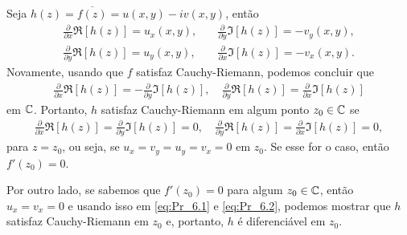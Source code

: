\begin{questions}
\begin{solution}
    Seja $h(z) = \overline{f(z)} = u(x,y) - iv(x,y)$, então
    \begin{align}
        \frac{\partial}{\partial x} \Re[h(z)] = u_x(x,y), &\quad
        \frac{\partial}{\partial y} \Im[h(z)] = -v_y(x,y), \label{eq:Pr_6.1}\\
        \frac{\partial}{\partial y} \Re[h(z)] = u_y(x,y), &\quad
        \frac{\partial}{\partial x} \Im[h(z)] = -v_x(x,y). \label{eq:Pr_6.2}
    \end{align}
    Novamente, usando que $f$ satisfaz Cauchy-Riemann, podemos concluir que
    \begin{align*}
        \frac{\partial}{\partial x} \Re[h(z)] = -\frac{\partial}{\partial y} \Im[h(z)],
            \quad \frac{\partial}{\partial y} \Re[h(z)] = \frac{\partial}{\partial x} \Im[h(z)]
    \end{align*}
    em ${\mathbb C}$. Portanto, $h$ satisfaz Cauchy-Riemann em algum ponto $z_0\in{\mathbb C}$ se
    \begin{align*}
        \frac{\partial}{\partial x} \Re[h(z)] = \frac{\partial}{\partial y} \Im[h(z)] = 0,
            \quad \frac{\partial}{\partial y} \Re[h(z)] = \frac{\partial}{\partial x} \Im[h(z)] = 0,
    \end{align*}
    para $z=z_0$, ou seja, se $u_x=v_y=u_y=v_x=0$ em $z_0$. Se esse for o caso, então $f'(z_0) = 0$.
    
    Por outro lado, se sabemos que $f'(z_0) = 0$ para algum $z_0\in{\mathbb C}$, então $u_x = v_x = 0$ e usando isso em \eqref{eq:Pr_6.1} e \eqref{eq:Pr_6.2}, podemos mostrar que $h$ satisfaz Cauchy-Riemann em $z_0$ e, portanto, $h$ é diferenciável em $z_0$.
\end{solution}


\end{questions}
